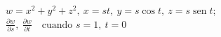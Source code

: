 \item $w = x^2 + y^2 + z^2, \ x = st, \ y = s \cos t, \ z = s \operatorname{sen} t$; \\
$\frac{\partial w}{\partial s}, \ \frac{\partial w}{\partial t} \quad \text{cuando } s = 1, \ t = 0$

